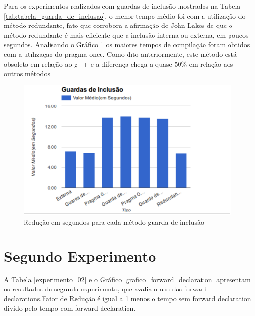 Para os experimentos realizados com guardas de inclusão mostrados na 
Tabela \ref{tab:tabela_guarda_de_inclusao}, o menor tempo médio foi
 com a utilização do método redundante, fato  que corrobora a afirmação
 de John Lakos de que o método redundante é mais eficiente que a inclusão
 interna ou externa, em poucos segundos. Analisando o Gráfico 
\ref{grafico_guardas_de_inclusao} os maiores tempos de compilação foram 
 obtidos com a utilização do pragma once. Como dito anteriormente, este 
método está obsoleto em relação ao g++ e a diferença chega a quase 50\%
 em relação aos outros métodos.

\begin{figure}[h]
    \centering
        \includegraphics[keepaspectratio=true,scale=1]{figuras/guardas_de_inclusao.eps}
    \caption{Redução em segundos para cada método guarda de inclusão}
    \label{grafico_guardas_de_inclusao}
\end{figure}


\section{Segundo Experimento}


A Tabela \ref{experimento_02} e o Gráfico \ref{grafico_forward_declaration} apresentam os resultados do
 segundo experimento, que avalia o uso das forward declarations.Fator de
 Redução é igual a 1 menos o tempo sem forward declaration divido pelo
 tempo com forward declaration.



